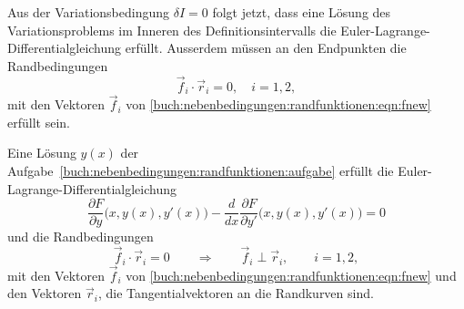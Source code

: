Aus der Variationsbedingung $\delta I=0$ folgt jetzt, dass eine
Lösung des Variationsproblems im Inneren des Definitionsintervalls
die Euler-Lagrange-Differentialgleichung erfüllt.
Ausserdem müssen an den Endpunkten die Randbedingungen
\begin{equation}
\vec{f}_i\cdot\vec{r}_i
=
0,\quad i=1,2,
\end{equation}
mit den Vektoren $\vec{f}_i$ von
\eqref{buch:nebenbedingungen:randfunktionen:eqn:fnew}
erfüllt sein.

\begin{satz}
\label{buch:nebenbedingungen:randfunktionen:satz:loesung}
Eine Lösung $y(x)$ der
Aufgabe~\ref{buch:nebenbedingungen:randfunktionen:aufgabe}
erfüllt die Euler-Lagrange-Differentialgleichung
\begin{equation}
\frac{\partial F}{\partial y}\bigl(x,y(x),y'(x)\bigr)
-
\frac{d}{dx}
\frac{\partial F}{\partial y'}\bigl(x,y(x),y'(x)\bigr)
=
0
\end{equation}
und die Randbedingungen
\[
\vec{f}_i\cdot \vec{r}_i =  0
\qquad\Rightarrow\qquad
\vec{f}_i\perp\vec{r}_i,\qquad i=1,2,
\]
mit den Vektoren $\vec{f}_i$ von
\eqref{buch:nebenbedingungen:randfunktionen:eqn:fnew}
und den Vektoren $\vec{r}_i$, die Tangentialvektoren an die Randkurven
sind.
\end{satz}


